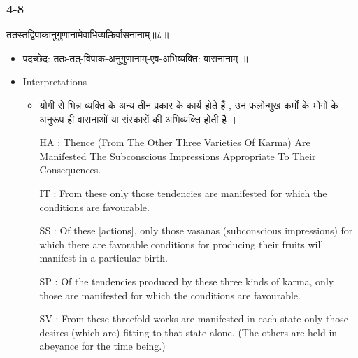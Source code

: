 \begin{frame}[fragile]\frametitle{4-8}
\begin{sanskrit}
ततस्तद्विपाकानुगुणानामेवाभिव्यक्तिर्वासनानाम्॥८॥
\end{sanskrit}

	\begin{itemize}
	\item पदच्छेद:  ततः-तत्-विपाक-अनुगुणानाम्-एव-अभिव्यक्ति: वासनानाम् ॥
	\item Interpretations
		\begin{itemize}	
		\item  योगी से भिन्न व्यक्ति के अन्य तीन प्रकार के कार्य होते हैं , उन फलोन्मुख कर्मों के भोगों के अनुरूप ही वासनाओं या संस्कारों की अभिव्यक्ति होती है ।
		\item [HA]: Thence (From The Other Three Varieties Of Karma) Are Manifested The Subconscious Impressions Appropriate To Their Consequences.
		\item [IT]: From these only those tendencies are manifested for which the conditions are favourable.
		\item [SS]: Of these [actions], only those vasanas (subconscious impressions) for which there are favorable conditions for producing their fruits will manifest in a particular birth.
		\item [SP]: Of the tendencies produced by these three kinds of karma, only those are manifested for which the conditions are favourable.
		\item [SV]: From these threefold works are manifested in each state only those desires (which are) fitting to that state alone. (The others are held in abeyance for the time being.) 
		\end{itemize}
	\end{itemize}
\end{frame}

